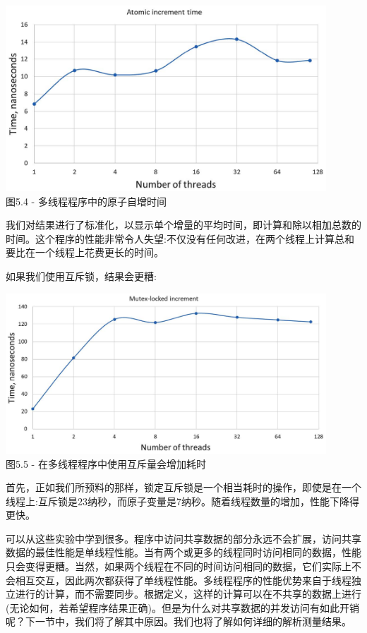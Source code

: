 \begin{center}
\includegraphics[width=0.9\textwidth]{content/1/chapter5/images/4.jpg}\\
图5.4 - 多线程程序中的原子自增时间
\end{center}

我们对结果进行了标准化，以显示单个增量的平均时间，即计算和除以相加总数的时间。这个程序的性能非常令人失望:不仅没有任何改进，在两个线程上计算总和要比在一个线程上花费更长的时间。

如果我们使用互斥锁，结果会更糟:

\begin{center}
\includegraphics[width=0.9\textwidth]{content/1/chapter5/images/5.jpg}\\
图5.5 - 在多线程程序中使用互斥量会增加耗时
\end{center}

首先，正如我们所预料的那样，锁定互斥锁是一个相当耗时的操作，即使是在一个线程上:互斥锁是23纳秒，而原子变量是7纳秒。随着线程数量的增加，性能下降得更快。

可以从这些实验中学到很多。程序中访问共享数据的部分永远不会扩展，访问共享数据的最佳性能是单线程性能。当有两个或更多的线程同时访问相同的数据，性能只会变得更糟。当然，如果两个线程在不同的时间访问相同的数据，它们实际上不会相互交互，因此两次都获得了单线程性能。多线程程序的性能优势来自于线程独立进行的计算，而不需要同步。根据定义，这样的计算可以在不共享的数据上进行(无论如何，若希望程序结果正确)。但是为什么对共享数据的并发访问有如此开销呢？下一节中，我们将了解其中原因。我们也将了解如何详细的解析测量结果。








